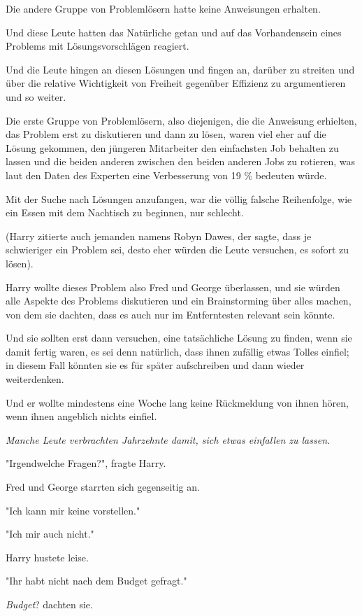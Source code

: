 {Die andere Gruppe von Problemlösern hatte keine Anweisungen erhalten.

Und diese Leute hatten das Natürliche getan und auf das Vorhandensein eines Problems mit Lösungsvorschlägen reagiert.

Und die Leute hingen an diesen Lösungen und fingen an, darüber zu streiten und über die relative Wichtigkeit von Freiheit gegenüber Effizienz zu argumentieren und so weiter.

Die erste Gruppe von Problemlösern, also diejenigen, die die Anweisung erhielten, das Problem erst zu diskutieren und dann zu lösen, waren viel eher auf die Lösung gekommen, den jüngeren Mitarbeiter den einfachsten Job behalten zu lassen und die beiden anderen zwischen den beiden anderen Jobs zu rotieren, was laut den Daten des Experten eine Verbesserung von 19 \% bedeuten würde.

Mit der Suche nach Lösungen anzufangen, war die völlig falsche Reihenfolge, wie ein Essen mit dem Nachtisch zu beginnen, nur schlecht.

(Harry zitierte auch jemanden namens Robyn Dawes, der sagte, dass je schwieriger ein Problem sei, desto eher würden die Leute versuchen, es sofort zu lösen).

Harry wollte dieses Problem also Fred und George überlassen, und sie würden alle Aspekte des Problems diskutieren und ein Brainstorming über alles machen, von dem sie dachten, dass es auch nur im Entferntesten relevant sein könnte.

Und sie sollten erst dann versuchen, eine tatsächliche Lösung zu finden, wenn sie damit fertig waren, es sei denn natürlich, dass ihnen zufällig etwas Tolles einfiel; in diesem Fall könnten sie es für später aufschreiben und dann wieder weiterdenken.

Und er wollte mindestens eine Woche lang keine Rückmeldung von ihnen hören, wenn ihnen angeblich nichts einfiel.

\emph{Manche Leute verbrachten Jahrzehnte damit, sich etwas einfallen zu lassen.}

"Irgendwelche Fragen?", fragte Harry.

Fred und George starrten sich gegenseitig an.

"Ich kann mir keine vorstellen."

"Ich mir auch nicht."

Harry hustete leise.

"Ihr habt nicht nach dem Budget gefragt."

\emph{Budget}? dachten sie.

}

